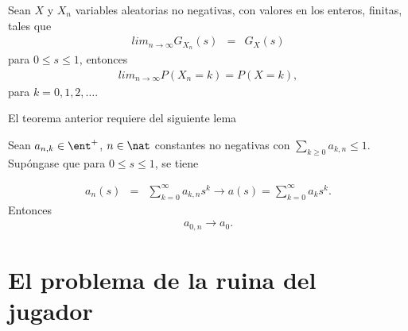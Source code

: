\begin{Teo}
Sean $X$ y $X_{n}$ variables aleatorias no negativas, con valores
en los enteros, finitas, tales que
\begin{eqnarray*}
lim_{n\rightarrow\infty}G_{X_{n}}\left(s\right)&=&G_{X}\left(s\right)
\end{eqnarray*}
para $0\leq s\leq1$, entonces
\begin{eqnarray*}
lim_{n\rightarrow\infty}P\left(X_{n}=k\right)=P\left(X=k\right),
\end{eqnarray*}
para $k=0,1,2,\ldots.$
\end{Teo}

El teorema anterior requiere del siguiente lema

\begin{Lemma}
Sean $a_{n,k}\in\ent^{+}$, $n\in\nat$ constantes no negativas con
$\sum_{k\geq0}a_{k,n}\leq1$. Sup\'ongase que para $0\leq s\leq1$,
se tiene

\begin{eqnarray*}
a_{n}\left(s\right)&=&\sum_{k=0}^{\infty}a_{k,n}s^{k}\rightarrow
a\left(s\right)=\sum_{k=0}^{\infty}a_{k}s^{k}.
\end{eqnarray*}
Entonces
\begin{eqnarray*}
a_{0,n}\rightarrow a_{0}.
\end{eqnarray*}
\end{Lemma}



\section{El problema de la ruina del jugador}

